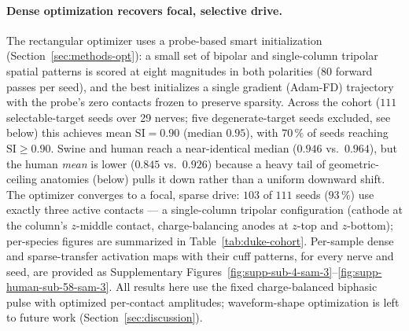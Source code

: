 \paragraph{Dense optimization recovers focal, selective drive.}
The rectangular optimizer uses a probe-based smart initialization
(Section~\ref{sec:methods-opt}): a small set of bipolar and
single-column tripolar spatial patterns is scored at eight magnitudes
in both polarities (80 forward passes per seed), and the best
initializes a single gradient (Adam-FD) trajectory with the probe's
zero contacts frozen to preserve sparsity.  Across the cohort ($111$ selectable-target seeds
over 29 nerves; five degenerate-target seeds excluded, see below) this
achieves mean $\mathrm{SI} = 0.90$ (median $0.95$), with $70\,\%$ of
seeds reaching $\mathrm{SI} \geq 0.90$.
Swine and human reach a near-identical median ($0.946$ vs.\ $0.964$),
but the human \emph{mean} is lower ($0.845$ vs.\ $0.926$) because a
heavy tail of geometric-ceiling anatomies (below) pulls it down rather
than a uniform downward shift.  The optimizer converges to a focal,
sparse drive: $103$ of $111$ seeds ($93\,\%$) use exactly three active
contacts --- a single-column tripolar configuration (cathode at the
column's $z$-middle contact, charge-balancing anodes at $z$-top and
$z$-bottom); per-species figures are summarized in
Table~\ref{tab:duke-cohort}.  Per-sample dense and
sparse-transfer activation maps with their cuff
patterns, for every nerve and seed, are provided as Supplementary
Figures~\ref{fig:supp-sub-4-sam-3}--\ref{fig:supp-human-sub-58-sam-3}.
All results here use the fixed charge-balanced biphasic pulse with
optimized per-contact amplitudes; waveform-shape optimization is left
to future work (Section~\ref{sec:discussion}).

